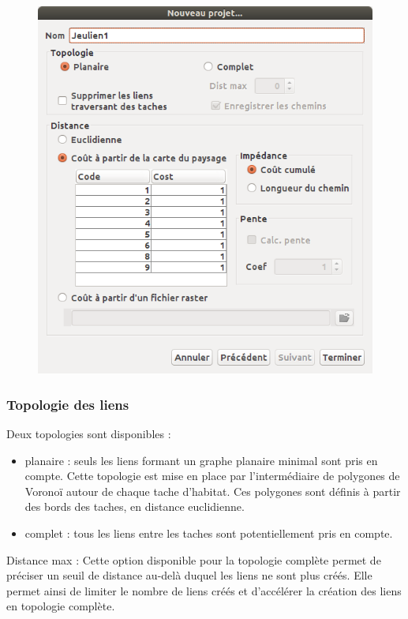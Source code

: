 \documentclass{article}
\begin{document}
\begin{figure}[H]
	\includegraphics[scale=0.5]{img/manual-fr_img4.png} 
\end{figure}

\subsubsection{Topologie des liens}

Deux topologies sont disponibles :
\begin{itemize}
	\item planaire : seuls les liens formant un graphe planaire minimal sont pris en compte. Cette topologie est mise en place par l’intermédiaire de polygones de Voronoï autour de chaque tache d’habitat. Ces polygones sont définis à partir des bords des taches, en distance euclidienne.
	\item complet : tous les liens entre les taches sont potentiellement pris en compte.
\end{itemize}

Distance max : Cette option disponible pour la topologie complète permet de préciser un seuil de distance au-delà duquel les liens ne sont plus créés. Elle permet ainsi de limiter le nombre de liens créés et d’accélérer la création des liens en topologie complète.
\end{document}
